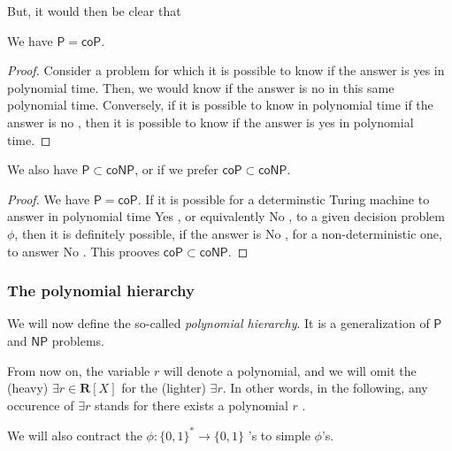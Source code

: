But, it would then be clear that 

\begin{proposition}
    We have $ \mathsf P = \mathsf{coP} $.
\end{proposition}

\begin{proof}
    Consider a problem for which it is possible to know if the answer is \og yes \fg in polynomial time. Then, we would know if the answer is \og no \fg in this same polynomial time. Conversely, if it is possible to know in polynomial time if the answer is \og no \fg, then it is possible to know if the answer is \og yes \fg in polynomial time.
\end{proof}

\begin{proposition}
    We also have $ \mathsf P \subset \mathsf{coNP} $, or if we prefer $ \mathsf{coP} \subset \mathsf{coNP} $.
\end{proposition}

\begin{proof}
    We have $ \mathsf P = \mathsf{coP} $. If it is possible for a determinstic Turing machine to answer in polynomial time \og Yes \fg, or equivalently \og No \fg, to a given decision problem $ \phi $, then it is definitely possible, if the answer is \og No \fg, for a non-deterministic one, to answer \og No \fg. This prooves $ \mathsf{coP} \subset \mathsf{coNP} $.
\end{proof}

\subsubsection{The polynomial hierarchy}

We will now define the so-called \textit{polynomial hierarchy}. It is a generalization of $ \mathsf P $ and $ \mathsf{NP} $ problems.

\begin{notation}
    From now on, the variable $ r $ will denote a polynomial, and we will omit the (heavy) \og $ \exists r \in \mathbf R[X] $ \fg for the (lighter) $ \exists r $. In other words, in the following, any occurence of $ \exists r $ stands for \og there exists a polynomial $ r $ \fg.

    We will also contract the \og $ \phi : \{ 0,1 \}^* \to \{ 0,1 \} $ \fg's to simple $ \phi $'s.
\end{notation}

